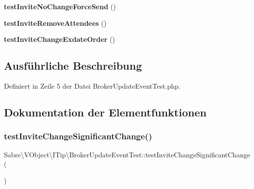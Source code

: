 \begin{DoxyCompactItemize}
{\bfseries test\+Invite\+No\+Change\+Force\+Send} ()
\item 
\mbox{\label{class_sabre_1_1_v_object_1_1_i_tip_1_1_broker_update_event_test_a4ad70441d2cab7c8c195c17cdd14a0ed}} 
{\bfseries test\+Invite\+Remove\+Attendees} ()
\item 
\mbox{\label{class_sabre_1_1_v_object_1_1_i_tip_1_1_broker_update_event_test_af4991ccb99fe99ed94bd39b5d39c208b}} 
{\bfseries test\+Invite\+Change\+Exdate\+Order} ()
\end{DoxyCompactItemize}


\subsection{Ausführliche Beschreibung}


Definiert in Zeile 5 der Datei Broker\+Update\+Event\+Test.\+php.



\subsection{Dokumentation der Elementfunktionen}
\mbox{\label{class_sabre_1_1_v_object_1_1_i_tip_1_1_broker_update_event_test_af78386d4680bacdc6b6c7bb52476136b}} 
\subsubsection{\texorpdfstring{test\+Invite\+Change\+Significant\+Change()}{testInviteChangeSignificantChange()}}
{\footnotesize\ttfamily Sabre\textbackslash{}\+V\+Object\textbackslash{}\+I\+Tip\textbackslash{}\+Broker\+Update\+Event\+Test\+::test\+Invite\+Change\+Significant\+Change (\begin{DoxyParamCaption}{ }\end{DoxyParamCaption})}

